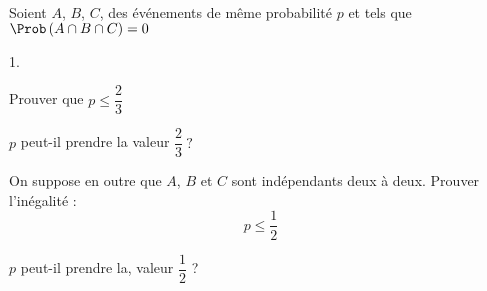 \documentclass[11pt]{article}%
\begin{document}
\begin{exerciceSP}~\\
  Soient $A$, $B$, $C$, des événements de même probabilité $p$ et tels
  que $\Prob\left( A\cap B\cap C\right) =0$

  \begin{noliste}{1.}
    \setlength{\itemsep}{2mm}
  \item Prouver que $p\leq \dfrac{2}{3}$

  \item $p$ peut-il prendre la valeur $\dfrac{2}{3}\ ?$

  \item On suppose en outre que $A$, $B$ et $C$ sont indépendants deux 
    à deux. Prouver l'inégalité :%
    \begin{equation*}
      p\leq \frac{1}{2}
    \end{equation*}

  \item $p$ peut-il prendre la, valeur $\dfrac{1}{2}$ ?
  \end{noliste}
\end{exerciceSP}
\end{document}
